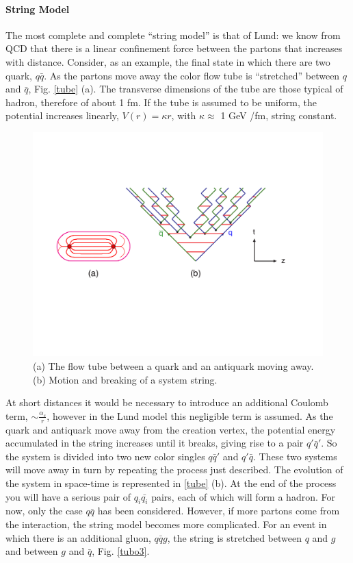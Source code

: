 \paragraph*{String Model}
The most complete and complete ``string model'' is that of Lund: we know from QCD that there is a linear confinement force between the partons that increases with distance. Consider, as an example, the final state in which there are two quark, $ q \bar{q} $. As the partons move away the color flow tube is ``stretched'' between $ q $ and $ \bar{q} $, Fig. \ref{tube} (a). The transverse dimensions of the tube are those typical of hadron, therefore of about 1 fm.
If the tube is assumed to be uniform, the potential increases linearly, $ V (r) = \kappa r $, with $ \kappa \approx $ 1 GeV /fm, string constant.
\begin{figure}
\centering
\includegraphics[scale= 0.5]{../Cap3/Fig_MC/stringone}
\caption{(a) The flow tube between a quark and an antiquark moving away. (b) Motion and breaking of a system string.}
\label{tubo}
\end{figure}
At short distances it would be necessary to introduce an additional Coulomb term, $ \sim \frac{\alpha_s}{r} $, however in the Lund model this negligible term is assumed.
As the quark and antiquark move away from the creation vertex, the potential energy accumulated in the string increases until it breaks, giving rise to a pair $ q '\bar{q}' $. So the system is divided into two new color singles $ q \bar{q} '$ and $ q' \bar{q} $. These two systems will move away in turn by repeating the process just described. The evolution of the system in space-time is represented in \ref{tube} (b).
At the end of the process you will have a serious pair of $ q_i \bar{q_i} $ pairs, each of which will form a hadron.
For now, only the case $ q \bar{q} $ has been considered. However, if more partons come from the interaction, the string model becomes more complicated. For an event in which there is an additional gluon, $ q \bar{q} g $, the string is stretched between $ q $ and $ g $ and between $ g $ and $ \bar{q} $, Fig. \ref{tubo3}.


